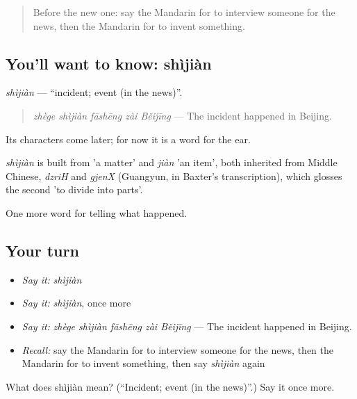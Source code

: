 \label{lesson:ZH-C291-shijian}



\begin{quote}
Before the new one: say the Mandarin for to interview someone for the news, then the Mandarin for to invent something.
\end{quote}

\subsection*{You'll want to know: shìjiàn}
\emph{shìjiàn} — \textquotedblleft{}incident; event (in the news)\textquotedblright{}.

\begin{quote}
\emph{zhège shìjiàn fāshēng zài Běijīng} — The incident happened in Beijing.
\end{quote}

Its characters come later; for now it is a word for the ear.

\begin{cousinweb}
\emph{shìjiàn} is built from  'a matter' and \emph{jiàn} 'an item', both inherited from Middle Chinese, \emph{dzriH} and \emph{gjenX} (Guangyun, in Baxter's transcription), which glosses the second 'to divide into parts'.
\end{cousinweb}

\begin{grammarlens}[title={What you've built}]
One more word for telling what happened.
\end{grammarlens}

\subsection*{Your turn}
\begin{itemize}
\raggedright
  \item \emph{Say it:} \emph{shìjiàn}
  \item \emph{Say it:} \emph{shìjiàn}, once more
  \item \emph{Say it:} \emph{zhège shìjiàn fāshēng zài Běijīng} — The incident happened in Beijing.
  \item \emph{Recall:} say the Mandarin for to interview someone for the news, then the Mandarin for to invent something, then say \emph{shìjiàn} again
\end{itemize}

\begin{tcolorbox}[breakable,colback=teal!4,colframe=teal!35!black,title={Before you move on}]
What does shìjiàn mean? (\textquotedblleft{}Incident; event (in the news)\textquotedblright{}.) Say it once more.
\end{tcolorbox}
